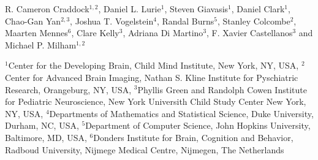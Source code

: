 R. Cameron Craddock$^{1,2}$,
Daniel L. Lurie$^1$,
Steven Giavasis$^{1}$,
Daniel Clark$^{1}$,
Chao-Gan Yan$^{2,3}$,
Joshua T. Vogelstein$^4$,
Randal Burns$^5$,
Stanley Colcombe$^2$,
Maarten Mennes$^6$,
Clare Kelly$^3$,
Adriana Di Martino$^3$,
F. Xavier Castellanos$^3$ and
Michael P. Milham$^{1,2}$



$^1${Center for the Developing Brain, Child Mind Institute, New York, NY, USA},
$^2${Center for Advanced Brain Imaging, Nathan S. Kline Institute for Pyschiatric Research, Orangeburg, NY, USA},
$^3${Phyllis Green and Randolph Cowen Institute for Pediatric Neuroscience, New York Universith Child Study Center New York, NY, USA},
$^4${Departments of Mathematics and Statistical Science, Duke University, Durham, NC, USA},
$^5${Department of Computer Science, John Hopkins University, Baltimore, MD, USA},
$^6${Donders Institute for Brain, Cognition and Behavior, Radboud University, Nijmege Medical Centre, Nijmegen, The Netherlands}

